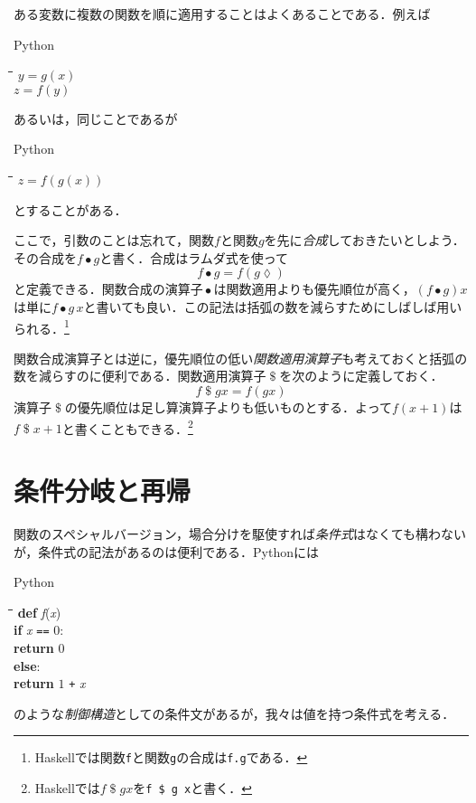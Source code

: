 \documentclass[twocolumn]{jsbook}
\newcommand{\keyword}[1]{{\emph{#1}}}
\newcommand{\code}[1]{\texttt{#1}}
\newenvironment{pythoncode}{\begin{itembox}[r]{Python}}{\end{itembox}}
\newenvironment{python}{\begin{tabbing}\hspace*{1em}\=\hspace*{1em}\=\hspace*{1em}\=\hspace*{1em}\=\kill}{\end{tabbing}}
\newcommand{\pthnId}[1]{\textit{#1}}
\newcommand{\pthnKeyword}[1]{\textbf{#1}}
\newcommand{\pthnOp}[1]{\texttt{#1}}
\DeclareMathOperator{\mathApply}{\$}
\DeclareMathOperator{\mathCompose}{\bullet}
\newcommand{\mathLambdaAnonymousParameter}{\lozenge}
\begin{document}
ある変数に複数の関数を順に適用することはよくあることである．例えば
\begin{pythoncode}
\begin{python}
$y=g(x)$\\
$z=f(y)$
\end{python}
\end{pythoncode}
あるいは，同じことであるが
\begin{pythoncode}
\begin{python}
$z=f(g(x))$
\end{python}
\end{pythoncode}
とすることがある．

ここで，引数のことは忘れて，関数$f$と関数$g$を先に\keyword{合成}しておきたいとしよう．その合成を$f\mathCompose g$と書く．合成はラムダ式を使って$$f\mathCompose g=f(g\mathLambdaAnonymousParameter)$$と定義できる．関数合成の演算子$\mathCompose$は関数適用よりも優先順位が高く，$(f\mathCompose g)x$は単に$f\mathCompose g\,x$と書いても良い．この記法は括弧の数を減らすためにしばしば用いられる．\footnote{Haskellでは関数\code{f}と関数\code{g}の合成は\code{f.g}である．}

関数合成演算子とは逆に，優先順位の低い\keyword{関数適用演算子}も考えておくと括弧の数を減らすのに便利である．関数適用演算子$\mathApply$を次のように定義しておく．$$f\mathApply gx=f(gx)$$演算子$\mathApply$の優先順位は足し算演算子よりも低いものとする．よって$f(x+1)$は$f\mathApply x+1$と書くこともできる．\footnote{Haskellでは$f\mathApply gx$を\code{f \$ g x}と書く．}

\section{条件分岐と再帰}

関数のスペシャルバージョン，場合分けを駆使すれば\keyword{条件式}はなくても構わないが，条件式の記法があるのは便利である．Pythonには
\begin{pythoncode}
\begin{python}
\pthnKeyword{def} \pthnId{f}(\pthnId{x})\\
\>\pthnKeyword{if} \pthnId{x} \pthnOp{==} $0$:\\
\>\>\pthnKeyword{return} $0$\\
\>\pthnKeyword{else}:\\
\>\>\pthnKeyword{return} $1$ \pthnOp{+} \pthnId{x}
\end{python}
\end{pythoncode}
のような\keyword{制御構造}としての条件文があるが，我々は値を持つ条件式を考える．
\end{document}
